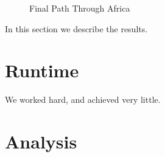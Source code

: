\documentclass[12pt]{article}
\begin{document}
\begin{figure}
\begin{center}
\setlength\fboxsep{1.00pt}
\setlength\fboxrule{1.00pt}
\caption{Final Path Through Africa}
\end{center}
\end{figure}

In this section we describe the results.

\section{Runtime}
We worked hard, and achieved very little.

\section{Analysis}
\end{document}
